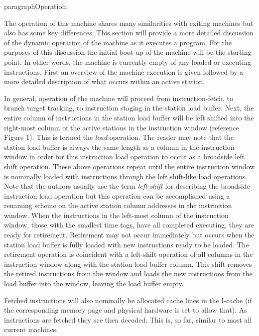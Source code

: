 
paragraph{Operation: }

The operation of this machine shares many similarities with exiting
machines but also has some key differences.  This section will provide
a more detailed discussion of the dynamic operation of the machine as
it executes a program.  For the purposes of this discussion the initial
boot-up of the machine will be the starting point.  In other words, the
machine is currently empty of any loaded or executing instructions.
First an overview of the machine execution is given followed by a more
detailed description of what occurs within an active station.

In general, operation of the machine will proceed from
instruction-fetch, to branch target tracking, to instruction staging in
the station load buffer.  Next, the entire column of instructions in
the station load buffer will be left shifted into the right-most column
of the active stations in the instruction window (reference Figure 1).
This is termed the {\it load} operation.  The reader may note that the
station load buffer is always the same length as a column in the
instruction window in order for this instruction load operation to
occur as a broadside left shift operation.  These above operations
repeat until the entire instruction window is nominally loaded with
instructions through the left shift-like load operations.  Note that
the authors usually use the term {\it left-shift} for describing the
broadside instruction load operation but this operation can be
accomplished using a renaming scheme on the active station column
addresses in the instruction window.  When the instructions in the
left-most column of the instruction window, those with the smallest
time tags, have all completed executing, they are ready for
retirement.  Retirement may not occur immediately but occurs when the
station load buffer is fully loaded with new instructions ready to be
loaded.  The retirement operation is coincident with a left-shift
operation of all columns in the instruction window along with the
station load buffer column.  This shift removes the retired
instructions from the window and loads the new instructions from the
load buffer into the window, leaving the load buffer empty.

Fetched instructions will also nominally be allocated cache lines in
the I-cache (if the corresponding memory page and physical hardware is
set to allow that).  As instructions are fetched they are then
decoded.  This is, so far, similar to most all current machines.

